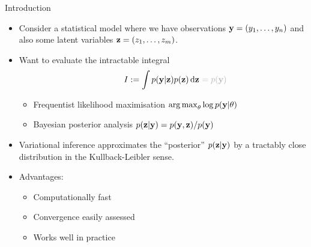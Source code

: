 \begin{frame}{Introduction}
  \begin{itemize}
    \item Consider a statistical model where we have observations ${\mathbf y} = (y_1, \dots, y_n)$ and also some latent variables ${\mathbf z} = (z_1, \dots, z_m)$.
    \pause  
    \item Want to evaluate the intractable integral
    \[
      I := \int p(\by|\bz)p(\bz) \d\bz \ \rlap{\color{gray!60} $= p(\by)$}
    \]
    \vspace{-0.8em}
    \begin{itemize}
      \item Frequentist likelihood maximisation {\color{gray!60} $\operatorname*{arg\,max}_\theta \log p({\mathbf y}|\theta)$} \vspace{0.2em}
      \item Bayesian posterior analysis {\color{gray!60} $p({\mathbf z}|{\mathbf y})=p({\mathbf y},{\mathbf z})/p({\mathbf y})$}
    \end{itemize}
    \pause
    \item Variational inference approximates the ``posterior'' $p({\mathbf z}|{\mathbf y})$ by a tractably close distribution in the Kullback-Leibler sense.
    \item<4-> Advantages:
    \begin{itemize}
      \item Computationally fast
      \item Convergence easily assessed
      \item Works well in practice
    \end{itemize}
  \end{itemize}
\end{frame}

